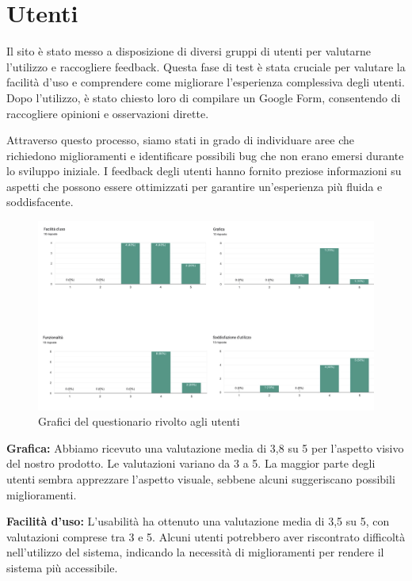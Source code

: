%
%
%
\section{Utenti}

Il sito è stato messo a disposizione di diversi gruppi di utenti per valutarne l'utilizzo e raccogliere feedback.
%
Questa fase di test è stata cruciale per valutare la facilità d'uso e comprendere come migliorare l'esperienza complessiva degli utenti.
%
Dopo l'utilizzo, è stato chiesto loro di compilare un Google Form, consentendo di raccogliere opinioni e osservazioni dirette.

Attraverso questo processo, siamo stati in grado di individuare aree che richiedono miglioramenti e identificare possibili bug che non erano emersi durante lo sviluppo iniziale.
%
I feedback degli utenti hanno fornito preziose informazioni su aspetti che possono essere ottimizzati per garantire un'esperienza più fluida e soddisfacente.

\begin{figure}[htbp]
    \centering
    \includegraphics[width=\textwidth]{img/GraficiUtenti.jpg}
    \caption{Grafici del questionario rivolto agli utenti}
    \label{fig:grafico_user_expirience}
\end{figure}

\textbf{Grafica:}
    Abbiamo ricevuto una valutazione media di 3,8 su 5 per l'aspetto visivo del nostro prodotto. Le valutazioni variano da 3 a 5. La maggior parte degli utenti sembra apprezzare l'aspetto visuale, sebbene alcuni suggeriscano possibili miglioramenti.

\textbf{Facilità d'uso:}
    L'usabilità ha ottenuto una valutazione media di 3,5 su 5, con valutazioni comprese tra 3 e 5. Alcuni utenti potrebbero aver riscontrato difficoltà nell'utilizzo del sistema, indicando la necessità di miglioramenti per rendere il sistema più accessibile.
    
